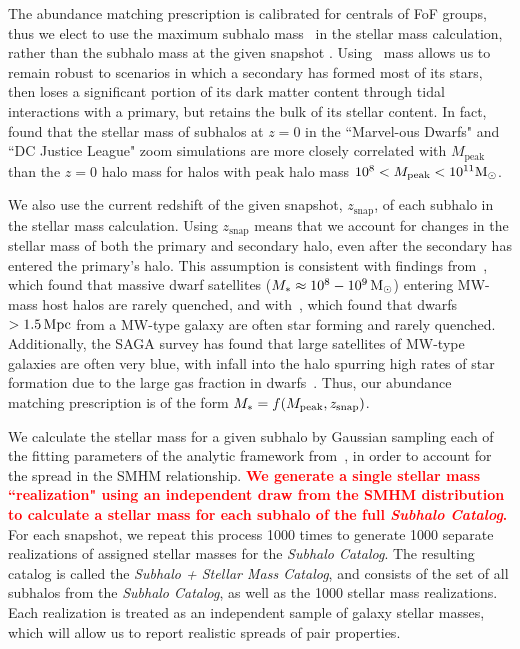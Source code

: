 \documentclass[linenumbers,twocolumn]{aastex631}
\newcommand{\add}[1]{\textcolor{red}{\textbf{#1}}}
\newcommand{\ms}[1]{\ensuremath{M_{*{#1}}}}
\newcommand{\subcat}{\textit{Subhalo Catalog}}
\newcommand{\starcat}{\textit{Subhalo + Stellar Mass Catalog}}
\begin{document}
    The abundance matching prescription is calibrated for centrals of FoF groups, thus we elect to use the maximum subhalo mass \Mpeak\ in the stellar mass calculation, rather than the subhalo mass at the given snapshot \citep[see][]{Besla2018}.
    Using \Mpeak\ mass allows us to remain robust to scenarios in which a secondary has formed most of its stars, then loses a significant portion of its dark matter content through tidal interactions with a primary, but retains the bulk of its stellar content.
    In fact, \citet{Munshi2021} found that the stellar mass of subhalos at $z=0$ in the ``Marvel-ous Dwarfs" and ``DC Justice League" zoom simulations are more closely correlated with $M_{\mathrm{peak}}$ than the $z=0$ halo mass for halos with peak halo mass $10^8<M_{\rm peak}<10^{11} \mathrm{M}_\odot$. 

    
    We also use the current redshift of the given snapshot, $z_{\mathrm{snap}}$, of each subhalo in the stellar mass calculation. 
    Using $z_{\mathrm{snap}}$ means that we account for changes in the stellar mass of both the primary and secondary halo, even after the secondary has entered the primary's halo. 
    This assumption is consistent with findings from~\cite{Akins2021}, which found that massive dwarf satellites ($M_*\approx 10^8-10^9\, \mathrm{M}_\odot$) entering MW-mass host halos are rarely quenched, and with~\cite{Geha2013}, which found that dwarfs $>1.5\,\mathrm{Mpc}$ from a MW-type galaxy are often star forming and rarely quenched.
    Additionally, the SAGA survey has found that large satellites of MW-type galaxies are often very blue, with infall into the halo spurring high rates of star formation due to the large gas fraction in dwarfs~\citep{Mao2021}. 
    Thus, our abundance matching prescription is of the form $\ms{}=f(\Mpeak,z_{\mathrm{snap}})$. 

    We calculate the stellar mass for a given subhalo by Gaussian sampling each of the fitting parameters of the analytic framework from~\cite{Moster2013}, in order to account for the spread in the SMHM relationship.
    \add{We generate a single stellar mass ``realization" using an independent draw from the SMHM distribution to calculate a stellar mass for each subhalo of the full \subcat.}
    For each snapshot, we repeat this process 1000 times to generate 1000 separate realizations of assigned stellar masses for the \subcat.
    The resulting catalog is called the \starcat, and consists of the set of all subhalos from the \subcat, as well as the 1000 stellar mass realizations. 
    Each realization is treated as an independent sample of galaxy stellar masses, which will allow us to report realistic spreads of pair properties. 
\end{document}
